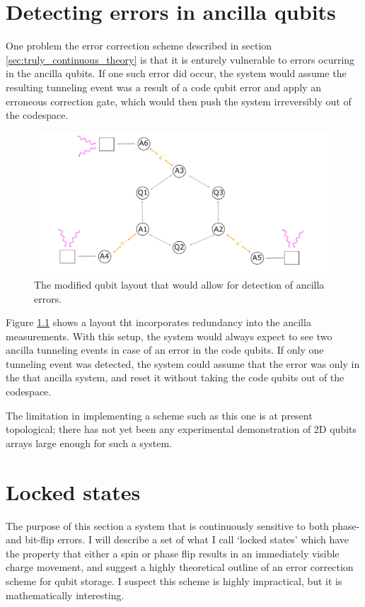 \documentclass{report}
\begin{document}
\begin{appendices}
\chapter{Detecting errors in ancilla qubits} \label{appendix:9qubitsystem}
One problem the error correction scheme described in section \ref{sec:truly_continuous_theory} is that it is enturely vulnerable to errors ocurring in the ancilla qubits. If one such error did occur, the system would assume the resulting tunneling event was a result of a code qubit error and apply an erroneous correction gate, which would then push the system irreversibly out of the codespace.
\begin{figure}[ht]
    \centering
    \includegraphics[scale = 0.9]{Figures/9q.pdf}
    \caption{The modified qubit layout that would allow for detection of ancilla errors.}
    \label{fig:9qubitlayout}
\end{figure}
Figure \ref{fig:9qubitlayout} shows a layout tht incorporates redundancy into the ancilla measurements. With this setup, the system would always expect to see two ancilla tunneling events in case of an error in the code qubits. If only one tunneling event was detected, the system could assume that the error was only in the that ancilla system, and reset it without taking the code qubits out of the codespace.

The limitation in implementing a scheme such as this one is at present topological; there has not yet been any experimental demonstration of 2D qubits arrays large enough for such a system.
\chapter{Locked states} \label{appendix:lockedstates}
The purpose of this section a system that is continuously sensitive to both phase- and bit-flip errors. I will describe a set of what I call `locked states' which have the property that either a spin or phase flip results in an immediately visible charge movement, and suggest a highly theoretical outline of an error correction scheme for qubit storage. I suspect this scheme is highly impractical, but it is mathematically interesting.


\end{appendices}
\end{document}
